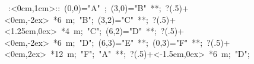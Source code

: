 
%

\hbox{
\xy    <1cm,0cm>:<0cm,1cm>::
       (0,0)="A" ; (3,0)="B" **\dir{-}; 
            ?(.5)+<0em,-2ex> *\hbox{6 m}; "B";
       (3,2)="C" **\dir{-}; ?(.5)+<1.25em,0ex> *\hbox{4 m};
       "C";  (6,2)="D" **\dir{-}; 
             ?(.5)+<0em,-2ex> *\hbox{6 m}; "D";
       (6,3)="E" **\dir{-}; (0,3)="F" **\dir{-}; 
             ?(.5)+<0em,2ex> *\hbox{12 m}; "F";
       "A" **\dir{-};
             ?(.5)+<-1.5em,0ex> *\hbox{6 m}; "D";
       \endxy}
